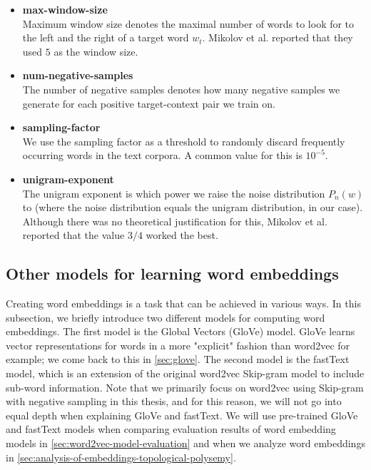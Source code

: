 \begin{itemize}
    \item \textbf{max-window-size} \\
        Maximum window size denotes the maximal number of words to look for to the left and the right of a target word $w_t$. Mikolov et al. reported that they used $5$ as the window size.
    \item \textbf{num-negative-samples} \\
        The number of negative samples denotes how many negative samples we generate for each positive target-context pair we train on.
    \item \textbf{sampling-factor} \\
        We use the sampling factor as a threshold to randomly discard frequently occurring words in the text corpora. A common value for this is $10^{-5}$.
    \item \textbf{unigram-exponent} \\
        The unigram exponent is which power we raise the noise distribution $P_n(w)$ to (where the noise distribution equals the unigram distribution, in our case). Although there was no theoretical justification for this, Mikolov et al. reported that the value $3/4$ worked the best.
\end{itemize}

\subsection{Other models for learning word embeddings}
\label{sec:other-models-for-learning-word-embeddings}
Creating word embeddings is a task that can be achieved in various ways. In this subsection, we briefly introduce two different models for computing word embeddings. The first model is the Global Vectors (GloVe) \cite{pennington2014glove} model. GloVe learns vector representations for words in a more "explicit" fashion than word2vec for example; we come back to this in \cref{sec:glove}. The second model is the fastText \cite{bojanowski2017enriching} model, which is an extension of the original word2vec Skip-gram model to include sub-word information. Note that we primarily focus on word2vec using Skip-gram with negative sampling in this thesis, and for this reason, we will not go into equal depth when explaining GloVe and fastText. We will use pre-trained GloVe and fastText models when comparing evaluation results of word embedding models in \cref{sec:word2vec-model-evaluation} and when we analyze word embeddings in \cref{sec:analysis-of-embeddings-topological-polysemy}.

